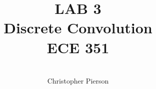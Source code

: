 



\documentclass[12pt]{article}

\usepackage[english]{babel}
\usepackage[utf8x]{inputenc}
\usepackage[T1]{fontenc}
\usepackage{graphicx}
\usepackage{amsmath}
\usepackage{caption}
\usepackage{float}
\usepackage{caption}
\usepackage{subcaption}
\usepackage{rotating}
\usepackage{setspace}

\usepackage[a4paper,top=3cm,bottom=2cm,left=3cm,right=3cm,marginparwidth=1.75cm]{geometry}

\usepackage[colorinlistoftodos]{todonotes}
\usepackage[colorlinks=true, allcolors=blue]{hyperref}
\usepackage{listings}
\usepackage{gensymb}



\title{%
	\textbf{LAB 3} \\
	Discrete Convolution \\
	 ECE 351 }

\author{\\
	Christopher Pierson}

	
	
\vspace{\fill}
\maketitle
\vspace{\fill}
\clearpage

\tableofcontents

